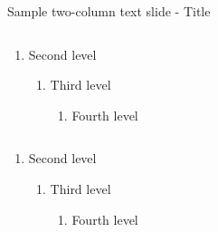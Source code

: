 \documentclass[aspectratio=169, t, 9pt]{beamer} %
\begin{document}
\begin{frame}{Sample two-column text slide - Title}
\begin{groupcolumns}
    \begin{column}{0.5\textwidth}
        \begin{enumerate}
            \item Second level
            \begin{enumerate}
                \item Third level
                \begin{enumerate}
                    \item Fourth level
                \end{enumerate}
            \end{enumerate}
        \end{enumerate}
    \end{column}
    \begin{column}{0.5\textwidth}
        \begin{enumerate}
            \item Second level
            \begin{enumerate}
                \item Third level
                \begin{enumerate}
                    \item Fourth level
                \end{enumerate}
            \end{enumerate}
        \end{enumerate}
    \end{column}
\end{groupcolumns}
\end{frame}
\end{document}
